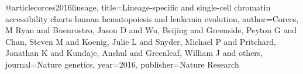 @article{corces2016lineage,
  title={Lineage-specific and single-cell chromatin accessibility charts human hematopoiesis and leukemia evolution},
  author={Corces, M Ryan and Buenrostro, Jason D and Wu, Beijing and Greenside, Peyton G and Chan, Steven M and Koenig, Julie L and Snyder, Michael P and Pritchard, Jonathan K and Kundaje, Anshul and Greenleaf, William J and others},
  journal={Nature genetics},
  year={2016},
  publisher={Nature Research}
}
